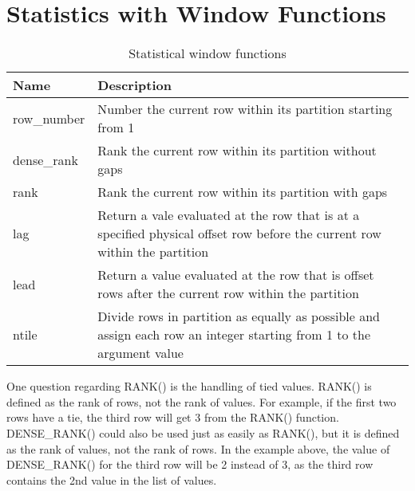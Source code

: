 \section{Statistics with Window Functions}
\begin{table}
    \centering
    \caption{Statistical window functions}
    \begin{tabularx}{\textwidth}{lX}
        \hline
        Name        & Description                                                                                                               \\
        \hline
        row\_number & Number the current row within its partition starting from 1                                                               \\
        dense\_rank & Rank the current row within its partition without gaps                                                                    \\
        rank        & Rank the current row within its partition with gaps                                                                       \\
        lag         & Return a vale evaluated at the row that is at a specified physical offset row before the current row within the partition \\
        lead        & Return a value evaluated at the row that is offset rows after the current row within the partition                        \\
        ntile       & Divide rows in partition as equally as possible and assign each row an integer starting from 1 to the argument value      \\
        \hline
    \end{tabularx}
\end{table}

\begin{tcolorbox}[title=Note]
    One question regarding RANK() is the handling of tied values. RANK() is defined as the rank of rows, not the rank of values. For example, if the first two rows have a tie, the third row will get 3 from the RANK() function. DENSE\_RANK() could also be used just as easily as RANK(), but it is defined as the rank of values, not the rank of rows. In the example above, the value of DENSE\_RANK() for the third row will be 2 instead of 3, as the third row contains the 2nd value in the list of values.
\end{tcolorbox}
